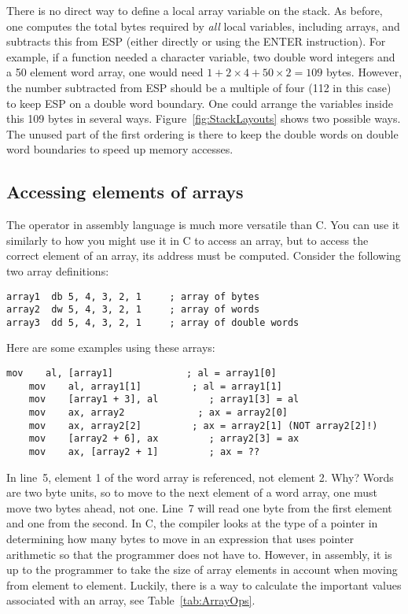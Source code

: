 There is no direct way to define a local array variable on the
stack. As before, one computes the total bytes required by \emph{all}
local variables, including arrays, and subtracts this from ESP (either
directly or using the {\code ENTER} instruction). For example, if a
function needed a character variable, two double word integers and a
50 element word array, one would need $1 + 2 \times 4 + 50 \times 2 =
109$ bytes. However, the number subtracted from ESP should be a
multiple of four (112 in this case) to keep ESP on a double word
boundary. One could arrange the variables inside this 109 bytes in
several ways. Figure~\ref{fig:StackLayouts} shows two possible ways. The
unused part of the first ordering is there to keep the double words on
double word boundaries to speed up memory accesses.

\subsection{Accessing elements of arrays}

The {\code [ ]} operator in assembly language is much more versatile than C.  You can
use it similarly to how you might use it in C to access an array, but to
access the correct element of an array, its address must be computed. Consider
the following two array definitions:
\begin{lstlisting}[language={[x86masm]Assembler}]
array1  db 5, 4, 3, 2, 1     ; array of bytes
array2  dw 5, 4, 3, 2, 1     ; array of words
array3  dd 5, 4, 3, 2, 1     ; array of double words
\end{lstlisting}
Here are some examples using these arrays:
\begin{lstlisting}[language={[x86masm]Assembler}]
	mov    al, [array1]             ; al = array1[0]
	mov    al, array1[1]         ; al = array1[1]
	mov    [array1 + 3], al         ; array1[3] = al
	mov    ax, array2             ; ax = array2[0]
	mov    ax, array2[2]         ; ax = array2[1] (NOT array2[2]!)
	mov    [array2 + 6], ax         ; array2[3] = ax
	mov    ax, [array2 + 1]         ; ax = ??
\end{lstlisting}
In line~5, element 1 of the word array is referenced, not element 2. Why?
Words are two byte units, so to move to the next element of a word array,
one must move two bytes ahead, not one. Line~7 will read one byte from the
first element and one from the second. In C, the compiler looks at the type
of a pointer in determining how many bytes to move in an expression that
uses pointer arithmetic so that the programmer does not have to. However,
in assembly, it is up to the programmer to take the size of array elements
in account when moving from element to element. Luckily, there is a way 
to calculate the important values associated with an array, see Table~\ref{tab:ArrayOps}.

